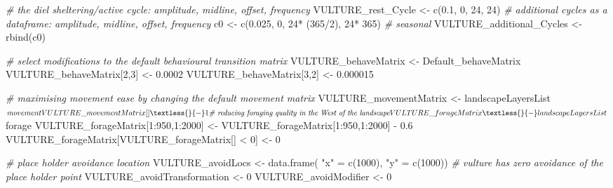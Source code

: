 \documentclass[10pt,a4paper]{article}
\newenvironment{Shaded}{}{}
\newcommand{\CommentTok}[1]{\textit{#1}}
\newcommand{\DecValTok}[1]{#1}
\newcommand{\FloatTok}[1]{#1}
\newcommand{\FunctionTok}[1]{#1}
\newcommand{\NormalTok}[1]{#1}
\newcommand{\OtherTok}[1]{#1}
\newcommand{\SpecialCharTok}[1]{#1}
\newcommand{\StringTok}[1]{#1}
\begin{document}
\begin{Shaded}
\begin{Highlighting}[]
\CommentTok{\# the diel sheltering/active cycle: amplitude, midline, offset, frequency}
\NormalTok{VULTURE\_rest\_Cycle }\OtherTok{\textless{}{-}} \FunctionTok{c}\NormalTok{(}\FloatTok{0.1}\NormalTok{, }\DecValTok{0}\NormalTok{, }\DecValTok{24}\NormalTok{, }\DecValTok{24}\NormalTok{)}
\CommentTok{\# additional cycles as a dataframe: amplitude, midline, offset, frequency}
\NormalTok{c0 }\OtherTok{\textless{}{-}} \FunctionTok{c}\NormalTok{(}\FloatTok{0.025}\NormalTok{, }\DecValTok{0}\NormalTok{, }\DecValTok{24}\SpecialCharTok{*}\NormalTok{ (}\DecValTok{365}\SpecialCharTok{/}\DecValTok{2}\NormalTok{), }\DecValTok{24}\SpecialCharTok{*} \DecValTok{365}\NormalTok{) }\CommentTok{\# seasonal}
\NormalTok{VULTURE\_additional\_Cycles }\OtherTok{\textless{}{-}} \FunctionTok{rbind}\NormalTok{(c0)}

\CommentTok{\# select modifications to the default behavioural transition matrix}
\NormalTok{VULTURE\_behaveMatrix }\OtherTok{\textless{}{-}}\NormalTok{ Default\_behaveMatrix}
\NormalTok{VULTURE\_behaveMatrix[}\DecValTok{2}\NormalTok{,}\DecValTok{3}\NormalTok{] }\OtherTok{\textless{}{-}} \FloatTok{0.0002}
\NormalTok{VULTURE\_behaveMatrix[}\DecValTok{3}\NormalTok{,}\DecValTok{2}\NormalTok{] }\OtherTok{\textless{}{-}} \FloatTok{0.000015}

\CommentTok{\# maximising movement ease by changing the default movement matrix}
\NormalTok{VULTURE\_movementMatrix }\OtherTok{\textless{}{-}}\NormalTok{ landscapeLayersList}\SpecialCharTok{$}\NormalTok{movement}
\NormalTok{VULTURE\_movementMatrix[] }\OtherTok{\textless{}{-}} \DecValTok{1}

\CommentTok{\# reducing foraging quality in the West of the landscape}
\NormalTok{VULTURE\_forageMatrix }\OtherTok{\textless{}{-}}\NormalTok{ landscapeLayersList}\SpecialCharTok{$}\NormalTok{forage}
\NormalTok{VULTURE\_forageMatrix[}\DecValTok{1}\SpecialCharTok{:}\DecValTok{950}\NormalTok{,}\DecValTok{1}\SpecialCharTok{:}\DecValTok{2000}\NormalTok{] }\OtherTok{\textless{}{-}}\NormalTok{ VULTURE\_forageMatrix[}\DecValTok{1}\SpecialCharTok{:}\DecValTok{950}\NormalTok{,}\DecValTok{1}\SpecialCharTok{:}\DecValTok{2000}\NormalTok{] }\SpecialCharTok{{-}} \FloatTok{0.6}
\NormalTok{VULTURE\_forageMatrix[VULTURE\_forageMatrix[] }\SpecialCharTok{\textless{}} \DecValTok{0}\NormalTok{] }\OtherTok{\textless{}{-}} \DecValTok{0}

\CommentTok{\# place holder avoidance location}
\NormalTok{VULTURE\_avoidLocs }\OtherTok{\textless{}{-}} \FunctionTok{data.frame}\NormalTok{(}
  \StringTok{"x"} \OtherTok{=} \FunctionTok{c}\NormalTok{(}\DecValTok{1000}\NormalTok{),}
  \StringTok{"y"} \OtherTok{=} \FunctionTok{c}\NormalTok{(}\DecValTok{1000}\NormalTok{))}
\CommentTok{\# vulture has zero avoidance of the place holder point}
\NormalTok{VULTURE\_avoidTransformation }\OtherTok{\textless{}{-}} \DecValTok{0}
\NormalTok{VULTURE\_avoidModifier }\OtherTok{\textless{}{-}} \DecValTok{0}
\end{Highlighting}
\end{Shaded}
\end{document}
